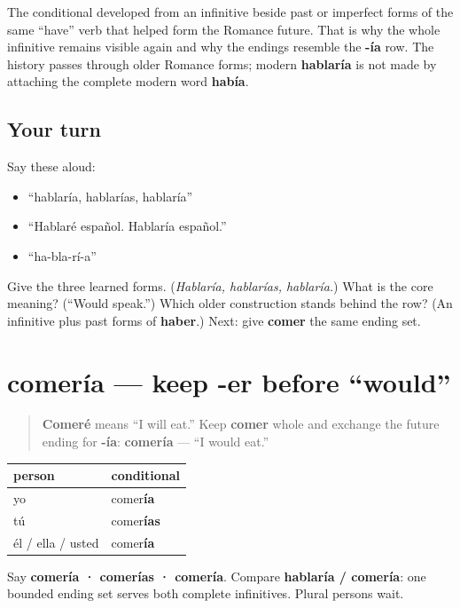 \begin{cousinweb}
The conditional developed from an infinitive beside past or imperfect forms of the same “have” verb that helped form the Romance future. That is why the whole infinitive remains visible again and why the endings resemble the \textbf{-ía} row. The history passes through older Romance forms; modern \textbf{hablaría} is not made by attaching the complete modern word \textbf{había}.
\end{cousinweb}

\subsection*{Your turn}
Say these aloud:

\begin{itemize}
\raggedright
  \item “hablaría, hablarías, hablaría”
  \item “Hablaré español. Hablaría español.”
  \item “ha-bla-rí-a”
\end{itemize}

\begin{tcolorbox}[breakable,colback=teal!4,colframe=teal!35!black,title={Before you move on}]
Give the three learned forms. (\emph{Hablaría, hablarías, hablaría.}) What is the core meaning? (“Would speak.”) Which older construction stands behind the row? (An infinitive plus past forms of \textbf{haber}.) Next: give \textbf{comer} the same ending set.
\end{tcolorbox}
\section[comería]{comería — keep -er before “would”}

\label{lesson:ES-C17-comer-condicional}



\begin{quote}
\textbf{Comeré} means “I will eat.” Keep \textbf{comer} whole and exchange the future ending for \textbf{-ía}: \textbf{comería} — “I would eat.”
\end{quote}

\begin{grammarlens}[title={Grammar Lens: the singular -er row}]
\noindent
\begin{tabularx}{\linewidth}{@{}>{\raggedright\arraybackslash}X>{\raggedright\arraybackslash}X@{}}
\toprule
\textbf{person} & \textbf{conditional} \\
\midrule
yo & comer\textbf{ía} \\
tú & comer\textbf{ías} \\
él / ella / usted & comer\textbf{ía} \\
\bottomrule
\end{tabularx}

Say \textbf{comería · comerías · comería}. Compare \textbf{hablaría / comería}: one bounded ending set serves both complete infinitives. Plural persons wait.
\end{grammarlens}

